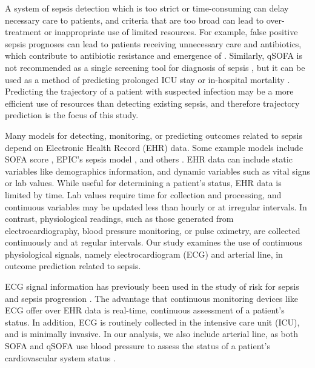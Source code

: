A system of sepsis detection which is too strict or time-consuming can delay necessary care to patients, and criteria that are too broad can lead to over-treatment or inappropriate use of limited resources. For example, false positive sepsis prognoses can lead to patients receiving unnecessary care and antibiotics, which contribute to antibiotic resistance and emergence of  \autocite{vanepps_reducing_2018, prestinaci_antimicrobial_2015, chokshi_global_2019}. Similarly, qSOFA is not recommended as a single screening tool for diagnosis of sepsis \autocite{evans_surviving_2021}, but it can be used as a method of predicting prolonged ICU stay or in-hospital mortality \autocite{seymour_assessment_2016}. Predicting the trajectory of a patient with suspected infection may be a more efficient use of resources than detecting existing sepsis, and therefore trajectory prediction is the focus of this study. 

Many models for detecting, monitoring, or predicting outcomes related to sepsis depend on Electronic Health Record (EHR) data. Some example models include SOFA score \autocite{sepsis-3}, EPIC's sepsis model \autocite{wong_external_2021}, and others \autocite{nesaragi_correlation_2021, morrill_signature_2019, taylor_prediction_2016}. EHR data can include static variables like demographics information, and dynamic variables such as vital signs or lab values. While useful for determining a patient's status, EHR data is limited by time. Lab values require time for collection and processing, and continuous variables may be updated less than hourly or at irregular intervals. In contrast, physiological readings, such as those generated from electrocardiography, blood pressure monitoring, or pulse oximetry, are collected continuously and at regular intervals. Our study examines the use of continuous physiological signals, namely electrocardiogram (ECG) and arterial line, in outcome prediction related to sepsis.

ECG signal information has previously been used in the study of risk for sepsis and sepsis progression \autocite{berger_shock_2013, moorman_cardiovascular_2011, nemati_interpretable_2018}. The advantage that continuous monitoring devices like ECG offer over EHR data is real-time, continuous assessment of a patient's status. In addition, ECG is routinely collected in the intensive care unit (ICU), and is minimally invasive. In our analysis, we also include arterial line, as both SOFA and qSOFA use blood pressure to assess the status of a patient's cardiovascular system status \autocite{sepsis-3}.

